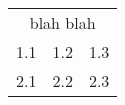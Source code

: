 \begin{tabular}{l|l|l}
\multicolumn{3}{|c|}{blah blah}\\
   1.1 & 1.2 & 1.3 \\
   2.1 & 2.2 & 2.3 \\
\end{tabular}

